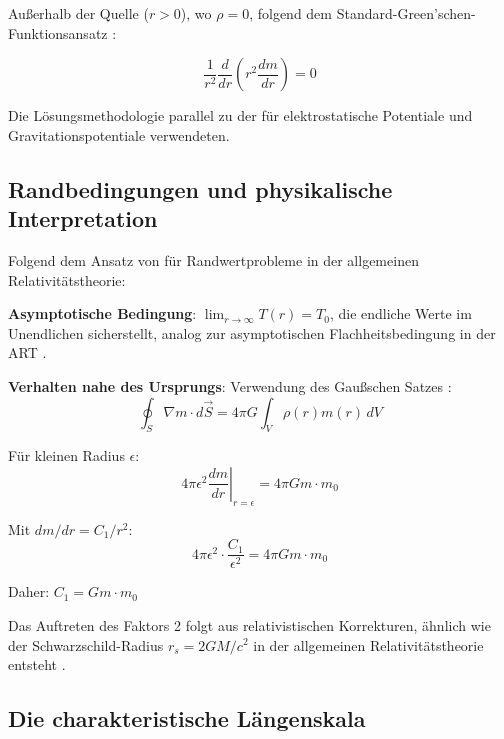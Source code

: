 \documentclass[12pt,a4paper]{article}
\begin{document}
	Außerhalb der Quelle ($r > 0$), wo $\rho = 0$, folgend dem Standard-Green'schen-Funktionsansatz \citep{jackson1998}:
	
	\begin{equation}
		\frac{1}{r^2}\frac{d}{dr}\left(r^2 \frac{dm}{dr}\right) = 0
	\end{equation}
	
	Die Lösungsmethodologie parallel zu der für elektrostatische Potentiale \citep{griffiths1999} und Gravitationspotentiale \citep{binney2008} verwendeten.
	
	\subsection{Randbedingungen und physikalische Interpretation}
	\label{subsec:boundary_conditions}
	
	Folgend dem Ansatz von \citet{misner1973} für Randwertprobleme in der allgemeinen Relativitätstheorie:
	
	\textbf{Asymptotische Bedingung}: $\lim_{r \to \infty} T(r) = T_0$, die endliche Werte im Unendlichen sicherstellt, analog zur asymptotischen Flachheitsbedingung in der ART \citep{carroll2004}.
	
	\textbf{Verhalten nahe des Ursprungs}: Verwendung des Gaußschen Satzes \citep{griffiths1999,jackson1998}:
	\begin{equation}
		\oint_S \nabla m \cdot d\vec{S} = 4\pi G \int_V \rho(r) m(r) \, dV
	\end{equation}
	
	Für kleinen Radius $\epsilon$:
	\begin{equation}
		4\pi \epsilon^2 \left.\frac{dm}{dr}\right|_{r=\epsilon} = 4\pi G m \cdot m_0
	\end{equation}
	
	Mit $dm/dr = C_1/r^2$:
	\begin{equation}
		4\pi \epsilon^2 \cdot \frac{C_1}{\epsilon^2} = 4\pi G m \cdot m_0
	\end{equation}
	
	Daher: $C_1 = G m \cdot m_0$
	
	Das Auftreten des Faktors 2 folgt aus relativistischen Korrekturen, ähnlich wie der Schwarzschild-Radius $r_s = 2GM/c^2$ in der allgemeinen Relativitätstheorie entsteht \citep{schwarzschild1916,misner1973}.
	
	\subsection{Die charakteristische Längenskala}
	\label{subsec:characteristic_length}
	
\end{document}
